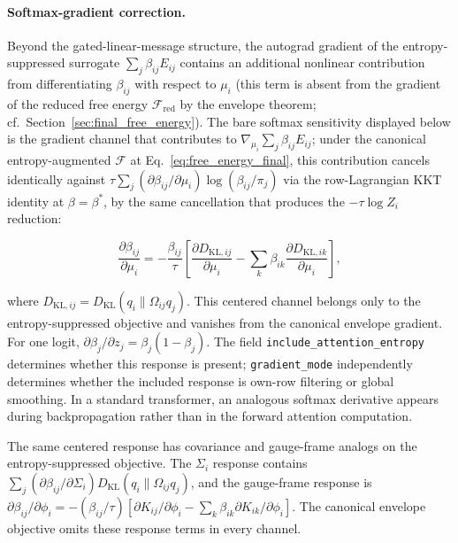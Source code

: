 \documentclass[twoside,11pt]{article}
\begin{document}
\paragraph{Softmax-gradient correction.}

Beyond the gated-linear-message structure, the autograd gradient of the entropy-suppressed surrogate $\sum_j \beta_{ij} E_{ij}$ contains an additional nonlinear contribution from differentiating $\beta_{ij}$ with respect to $\mu_i$ (this term is absent from the gradient of the reduced free energy $\mathcal{F}_{\mathrm{red}}$ by the envelope theorem; cf.\ Section~\ref{sec:final_free_energy}). The bare softmax sensitivity displayed below is the gradient channel that contributes to $\nabla_{\mu_i} \sum_j \beta_{ij} E_{ij}$; under the canonical entropy-augmented $\mathcal{F}$ at Eq.~\eqref{eq:free_energy_final}, this contribution cancels identically against $\tau \sum_j (\partial\beta_{ij}/\partial\mu_i) \log(\beta_{ij}/\pi_j)$ via the row-Lagrangian KKT identity at $\beta = \beta^*$, by the same cancellation that produces the $-\tau\log Z_i$ reduction:

\begin{equation}
\frac{\partial \beta_{ij}}{\partial \mu_i} = -\frac{\beta_{ij}}{\tau}\left[\frac{\partial D_{\mathrm{KL},ij}}{\partial \mu_i} - \sum_k \beta_{ik} \frac{\partial D_{\mathrm{KL},ik}}{\partial \mu_i}\right],
\label{eq:softmax_gradient_nonlinearity}
\end{equation}

where $D_{\mathrm{KL},ij}=D_{\mathrm{KL}}(q_i\|\Omega_{ij}q_j)$. This centered channel belongs only to the entropy-suppressed objective and vanishes from the canonical envelope gradient. For one logit, $\partial\beta_j/\partial z_j=\beta_j(1-\beta_j)$. The field \texttt{include\_attention\_entropy} determines whether this response is present; \texttt{gradient\_mode} independently determines whether the included response is own-row filtering or global smoothing. In a standard transformer, an analogous softmax derivative appears during backpropagation rather than in the forward attention computation.

The same centered response has covariance and gauge-frame analogs on the entropy-suppressed objective. The $\Sigma_i$ response contains $\sum_j(\partial\beta_{ij}/\partial\Sigma_i)D_{\mathrm{KL}}(q_i\|\Omega_{ij}q_j)$, and the gauge-frame response is $\partial\beta_{ij}/\partial\phi_i=-(\beta_{ij}/\tau)[\partial K_{ij}/\partial\phi_i-\sum_k\beta_{ik}\partial K_{ik}/\partial\phi_i]$. The canonical envelope objective omits these response terms in every channel.
\end{document}

